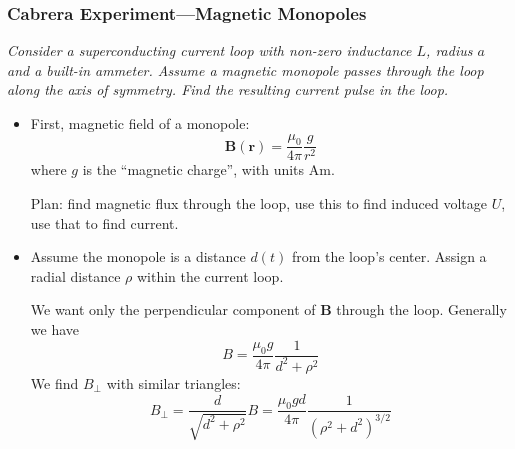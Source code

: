 \documentclass[11pt, a4paper]{article}
\renewcommand{\vec}[1]{\bm{#1}} %
\renewcommand{\r}{\vec{r}}
\newcommand{\B}{\vec{B}}  %
\newcommand{\mm}{\mu_{0}}  %
\newcommand{\m}{\vec{m}}  %
\begin{document}
\subsubsection{Cabrera Experiment---Magnetic Monopoles}
\textit{Consider a superconducting current loop with non-zero inductance $ L$, radius $ a $ and a built-in ammeter. Assume a magnetic monopole passes through the loop along the axis of symmetry. Find the resulting current pulse in the loop.}
\begin{itemize}
	\item First, magnetic field of a monopole:
	\begin{equation*}
		\B(\r) = \frac{\mm}{4\pi} \frac{g}{r^{2}}
	\end{equation*}
	where $ g $ is the ``magnetic charge'', with units $ \si{\ampere \meter} $.
	
	
	Plan: find magnetic flux through the loop, use this to find induced voltage $ U $, use that to find current.
	
	\item Assume the monopole is a distance $ d(t) $ from the loop's center. Assign a radial distance $ \rho $ within the current loop. 
	
	We want only the perpendicular component of $ \B $ through the loop. Generally we have
	\begin{equation*}
		B = \frac{\mm g}{4\pi}\frac{1}{d^{2} + \rho^{2}}
	\end{equation*}
	We find $ B_{\perp} $ with similar triangles:
	\begin{equation*}
		B_{\perp} = \frac{d}{\sqrt{d^{2} + \rho^{2}}} B = \frac{\mm g d}{4\pi}\frac{1}{(\rho^{2} + d^{2})^{3/2}}
	\end{equation*}
	

\end{itemize}
\end{document}

